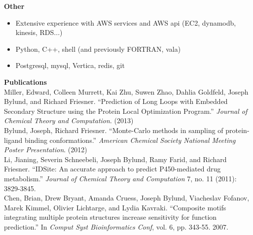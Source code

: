 \vspace{\mybigskip}
\myfontsize{\littleheader}
\textbf{Other}\\
\myfontsize{\bodysize}
\begin{itemize}[topsep=1ex, partopsep=0ex, parsep=0ex, itemsep=0.5ex]
    \item Extensive experience with AWS services and AWS api (EC2, dynamodb, kinesis, RDS...)
    \item Python, C++, shell (and previously FORTRAN, vala)
    \item Postgresql, mysql, Vertica, redis, git
\end{itemize}

\vspace{\mybigskip}
\vspace{\mybigskip}
\myfontsize{\littleheader}
\textbf{Publications}\\
\myfontsize{\bodysize}
\vspace{1ex}
Miller, Edward, Colleen Murrett, Kai Zhu, Suwen Zhao, Dahlia Goldfeld, Joseph Bylund, and Richard Friesner. ``Prediction of Long Loops with Embedded Secondary Structure using the Protein Local Optimization Program.'' \textit{Journal of Chemical Theory and Computation}. (2013)\\
\vspace{1ex}
Bylund, Joseph, Richard Friesner. ``Monte-Carlo methods in sampling of protein-ligand binding conformations.'' \textit{American Chemical Society National Meeting Poster Presentation}. (2012)\\
\vspace{1ex}
Li, Jianing, Severin Schneebeli, Joseph Bylund, Ramy Farid, and Richard Friesner. ``IDSite: An accurate approach to predict P450-mediated drug metabolism.'' \textit{Journal of Chemical Theory and Computation} 7, no. 11 (2011): 3829-3845.\\
\vspace{1ex}
Chen, Brian, Drew Bryant, Amanda Cruess, Joseph Bylund, Viacheslav Fofanov, Marek Kimmel, Olivier Lichtarge, and Lydia Kavraki. ``Composite motifs integrating multiple protein structures increase sensitivity for function prediction.'' In \textit{Comput Syst Bioinformatics Conf}, vol. 6, pp. 343-55. 2007.\\

